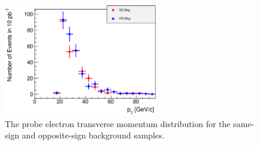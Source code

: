 \documentclass{cmspaper}
\begin{document}

\begin{figure}[htb]
  \begin{center}
    \includegraphics[width=0.6\textwidth]{plots/Efficiency_Isolation_Denominator_Pt_BkgSSOSComparison.eps}
    \caption{The probe electron transverse momentum distribution for the same-sign and opposite-sign background samples. }
    \label{fig:probept_bkgSSOS}
  \end{center}
\end{figure}
\end{document}
